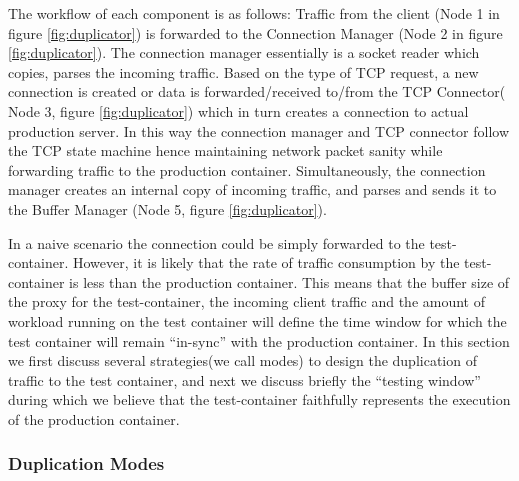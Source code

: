 The workflow of each component is as follows: Traffic from the client (Node 1 in figure \ref{fig:duplicator}) is forwarded to the Connection Manager (Node 2 in figure \ref{fig:duplicator}). 
The connection manager essentially is a socket reader which copies, parses the incoming traffic. 
Based on the type of TCP request, a new connection is created or data is forwarded/received to/from the TCP Connector( Node 3, figure \ref{fig:duplicator}) which in turn creates a connection to actual production server.
In this way the connection manager and TCP connector follow the TCP state machine hence maintaining network packet sanity while forwarding traffic to the production container.
Simultaneously, the connection manager creates an internal copy of incoming traffic, and parses and sends it to the Buffer Manager (Node 5, figure \ref{fig:duplicator}).
\fi

In a naive scenario the connection could be simply forwarded to the test-container. 
However, it is likely that the rate of traffic consumption by the test-container is less than the production container. 
This means that the buffer size of the proxy for the test-container, the incoming client traffic and the amount of workload running on the test container will define the time window for which the test container will remain ``in-sync'' with the production container.
In this section we first discuss several strategies(we call modes) to design the duplication of traffic to the test container, and next we discuss briefly the ``testing window'' during which we believe that the test-container faithfully represents the execution of the production container. 



\subsubsection{Duplication Modes}
\label{sec:dupMode}

